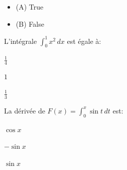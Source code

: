 \documentclass[12pt]{exam}
\begin{document}
\begin{questions}
\begin{itemize}[label={}]
  \item (A) True
  \item (B) False
\end{itemize}








\vspace{1em}





\question L'intégrale \( \int_0^1 x^2\,dx \) est égale à:



\begin{choices}

  
    \choice $\tfrac{1}{4}$
  

  
    \choice $1$
  

  
    \CorrectChoice $\tfrac{1}{3}$
  

\end{choices}









\vspace{1em}





\question La dérivée de \( F(x) = \int_0^x \sin t\,dt \) est:



\begin{choices}

  
    \choice $\cos x$
  

  
    \choice $-\sin x$
  

  
    \CorrectChoice $\sin x$
  

\end{choices}










\end{questions}
\end{document}
